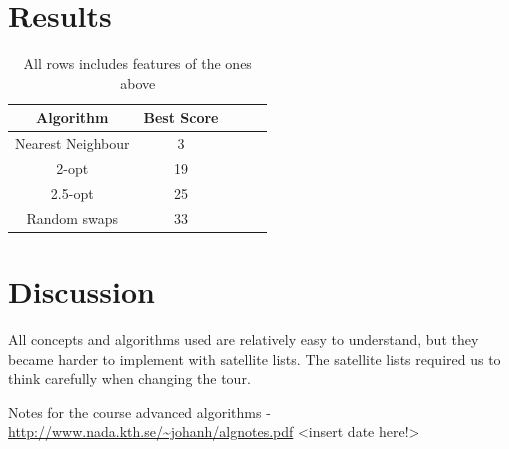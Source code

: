 \documentclass[paper=a4, fontsize=11pt,numbers=endperiod]{scrartcl} %
\numberwithin{equation}{section} %
\numberwithin{figure}{section} %
\numberwithin{table}{section} %
\begin{document}

\section{Results}

\begin{table}
  \centering
    \begin{tabular}{|c|c|c|c|c|}
    \hline
    \textbf{Algorithm} & \textbf{Best Score} \\ \hline
    Nearest Neighbour & 3 \\ \hline
    2-opt & 19 \\ \hline
    2.5-opt & 25 \\ \hline
    Random swaps & 33 \\ \hline
    \end{tabular}
    \caption{All rows includes features of the ones above}
    \hspace{10pt}
  \end{table}


\section{Discussion}


All concepts and algorithms used are relatively easy to understand, but they became harder to implement with satellite lists. The satellite lists required us to think carefully when changing the tour.




\newpage
\begin{thebibliography}{9}

 Notes for the course advanced algorithms - \url{http://www.nada.kth.se/~johanh/algnotes.pdf} <insert date here!>
 
\end{thebibliography}
\end{document}
